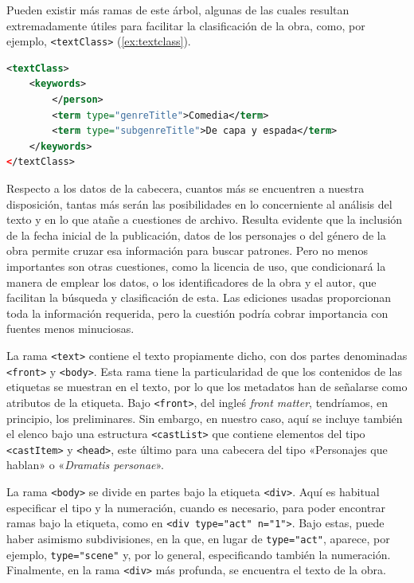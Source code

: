 Pueden existir más ramas de este árbol, algunas de las cuales resultan extremadamente útiles para facilitar la clasificación de la obra, como, por ejemplo, \texttt{<textClass>} (\ref{ex:textclass}). 

\begin{exe}
	\ex\label{ex:textclass}\begin{lstlisting}[language=xml,upquote=true,numbers=none]
<textClass>
	<keywords>
		</person>
		<term type="genreTitle">Comedia</term>
		<term type="subgenreTitle">De capa y espada</term>
	</keywords>
</textClass>
\end{lstlisting}\end{exe}

Respecto a los datos de la cabecera, cuantos más se encuentren a nuestra disposición, tantas más serán las posibilidades en lo concerniente al análisis del texto y en lo que atañe a cuestiones de archivo. Resulta evidente que la inclusión de la fecha inicial de la publicación, datos de los personajes o del género de la obra permite cruzar esa información para buscar patrones. Pero no menos importantes son otras cuestiones, como la licencia de uso, que condicionará la manera de emplear los datos, o los identificadores de la obra y el autor, que facilitan la búsqueda y clasificación de esta. Las ediciones usadas proporcionan toda la información requerida, pero la cuestión podría cobrar importancia con fuentes menos minuciosas.

La rama \texttt{<text>} contiene el texto propiamente dicho, con dos partes denominadas \texttt{<front>} y \texttt{<body>}. Esta rama tiene la particularidad de que los contenidos de las etiquetas se muestran en el texto, por lo que los metadatos han de señalarse como atributos de la etiqueta. Bajo \texttt{<front>}, del ingleś \textit{front matter}, tendríamos, en principio, los preliminares. Sin embargo, en nuestro caso, aquí se incluye también el elenco bajo una estructura \texttt{<castList>} que contiene elementos del tipo \texttt{<castItem>} y \texttt{<head>}, este último para una cabecera del tipo «Personajes que hablan» o «\textit{Dramatis personae}».

La rama \texttt{<body>} se divide en partes bajo la etiqueta \texttt{<div>}. Aquí es habitual especificar el tipo y la numeración, cuando es necesario, para poder encontrar ramas bajo la etiqueta, como en \texttt{<div type="act" n="1">}. Bajo estas, puede haber asimismo subdivisiones, en la que, en lugar de \texttt{type="act"}, aparece, por ejemplo, \texttt{type="scene"} y, por lo general, especificando también la numeración. Finalmente, en la rama \texttt{<div>} más profunda, se encuentra el texto de la obra.

